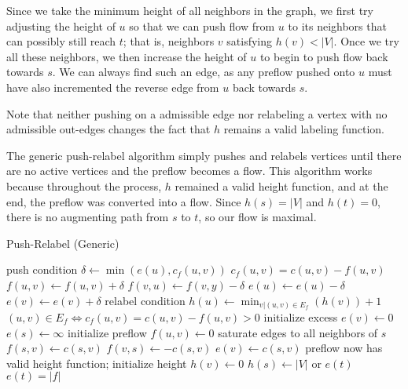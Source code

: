 Since we take the minimum height of all neighbors in the graph, we first try adjusting the height of $u$ so that we can push flow from $u$ to its neighbors that can possibly still reach $t$; that is, neighbors $v$ satisfying $h(v) < |V|$. Once we try all these neighbors, we then increase the height of $u$ to begin to push flow back towards $s$. We can always find such an edge, as any preflow pushed onto $u$ must have also incremented the reverse edge from $u$ back towards $s$.

Note that neither pushing on a admissible edge nor relabeling a vertex with no admissible out-edges changes the fact that $h$ remains a valid labeling function.

The generic push-relabel algorithm simply pushes and relabels vertices until there are no active vertices and the preflow becomes a flow. This algorithm works because throughout the process, $h$ remained a valid height function, and at the end, the preflow was converted into a flow. Since $h(s) = |V|$ and $h(t) = 0$, there is no augmenting path from $s$ to $t$, so our flow is maximal.

\begin{algorithm}[H]
\caption{Push-Relabel (Generic)}
\begin{algorithmic}
		\Comment push condition
		\State $\delta \gets \min(e(u), c_f(u,v))$
		\Comment $c_f(u,v) = c(u,v) - f(u,v)$
		\State $f(u,v) \gets f(u,v) + \delta$
		\State $f(v,u) \gets f(v,y) - \delta$
		\State $e(u) \gets e(u) - \delta$
		\State $e(v) \gets e(v) + \delta$
	\EndIf
\EndFunction
{}
		\Comment relabel condition
		\State $h(u) \gets \min_{v | (u,v) \in E_f}(h(v)) + 1$
		\Comment $(u,v) \in E_f \iff c_f(u,v) = c(u,v) - f(u,v) > 0$
	\EndIf
\EndFunction
{}
		\Comment initialize excess
		\State $e(v) \gets 0$
	\EndFor
	\State $e(s) \gets \infty$
		\Comment initialize preflow
		\State $f(u,v) \gets 0$
	\EndFor
		\Comment saturate edges to all neighbors of $s$
		\State $f(s,v) \gets c(s,v)$
		\State $f(v,s) \gets -c(s,v)$
		\State $e(v) \gets c(s,v)$
	\EndFor
		\Comment preflow now has valid height function; initialize height
		\State $h(v) \gets 0$
	\EndFor
	\State $h(s) \gets |V|$
		\State {} or 
	\EndWhile
	\State \Return $e(t)$
	\Comment $e(t)=|f|$
\EndFunction
\end{algorithmic}
\end{algorithm}

